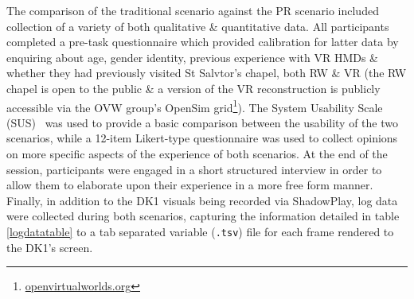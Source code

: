 The comparison of the traditional scenario against the PR scenario included collection of a variety of both qualitative \& quantitative data. All participants completed a pre-task questionnaire which provided calibration for latter data by enquiring about age, gender identity, previous experience with VR HMDs \& whether they had previously visited St Salvtor's chapel, both RW \& VR (the RW chapel is open to the public \& a version of the VR reconstruction is publicly accessible via the OVW group's OpenSim grid\footnote{\url{openvirtualworlds.org}}). The System Usability Scale (SUS)~\cite{Brooke1996} was used to provide a basic comparison between the usability of the two scenarios, while a 12-item Likert-type questionnaire was used to collect opinions on more specific aspects of the experience of both scenarios. At the end of the session, participants were engaged in a short structured interview in order to allow them to elaborate upon their experience in a more free form manner. Finally, in addition to the DK1 visuals being recorded via ShadowPlay, log data were collected during both scenarios, capturing the information detailed in table \ref{logdatatable} to a tab separated variable (\texttt{.tsv}) file for each frame rendered to the DK1's screen.

